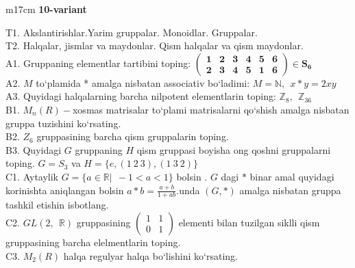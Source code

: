 \documentclass{article}
\begin{document}
\begin{tabular}{m{17cm}}
\textbf{10-variant}
\newline

T1. Akslantirishlar.Yarim gruppalar. Monoidlar. Gruppalar. \\
T2. Halqalar, jismlar va maydonlar. Qism halqalar va qism maydonlar. \\
A1. Gruppaning elementlar tartibini toping: \(\begin{pmatrix}
\mathbf{1} & \mathbf{2} & \mathbf{3} & \mathbf{4} & \mathbf{5} & \mathbf{6} \\
\mathbf{2} & \mathbf{3} & \mathbf{4} & \mathbf{5} & \mathbf{1} & \mathbf{6}
\end{pmatrix}\mathbf{\in}\mathbf{S}_{\mathbf{6}}\) \\
A2. \(M\) to`plamida * amalga nisbatan associativ bo`ladimi: \(M\mathbb{= N},\ \ x*y = 2xy\) \\
A3. Quyidagi halqalarning barcha nilpotent elementlarin toping: \(\mathbb{Z}_{8},\ \ \mathbb{Z}_{36}\) \\
B1. \(M_{n}(R) -\)xosmas matrisalar to`plami matrisalarni qo`shish amalga nisbatan gruppa tuzishini ko`rsating. \\
B2. \(Z_{6}\) gruppasining barcha qism gruppalarin toping. \\
B3. Quyidagi \(G\) gruppaning \(H\) qism gruppasi boyisha o\textquotesingle ng qo\textquotesingle shni gruppalarni toping. \(G = S_{3}\) va \(H = \{ e,(1\ 2\ 3),(1\ 3\ 2)\}\) \\
C1. Aytaylik \(G = \{ a\mathbb{\in R}|\ \  - 1 < a < 1\}\) bo\textquotesingle lsin . \(G\) dagi \(*\) binar amal quyidagi ko\textquotesingle rinishta aniqlangan bo\textquotesingle lsin \(a*b = \frac{a + b}{1 + ab}.\)unda \((G,*)\) amalga nisbatan gruppa tashkil etishin isbotlang. \\
C2. \(GL(2,\mathbb{\ \ R})\) gruppasining \(\begin{pmatrix}
1 & 1 \\
0 & 1
\end{pmatrix}\) elementi bilan tuzilgan siklli qism gruppasining barcha elelmentlarin toping. \\
C3. \(M_{2}(R)\) halqa regulyar halqa bo`lishini ko`rsating. \\

\end{tabular}
\vspace{1cm}
\end{document}

